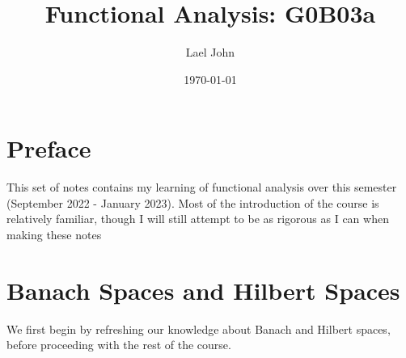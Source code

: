 \documentclass[12pt]{book}
\date{\today}
\title{Functional Analysis: G0B03a}
\author{Lael John}
\theoremstyle{definition}
\begin{document}
\maketitle
\chapter*{Preface}
This set of notes contains my learning of functional analysis over this semester (September 2022 - January 2023). Most of the introduction of the course is relatively familiar, though I will still attempt to be as rigorous as I can when making these notes
\tableofcontents
\chapter{Banach Spaces and Hilbert Spaces}
We first begin by refreshing our knowledge about Banach and Hilbert spaces, before proceeding with the rest of the course.
\end{document}
